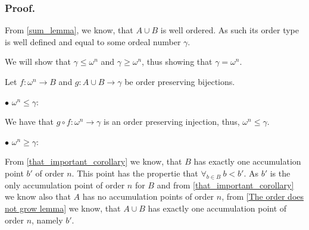 \subsubsection{Proof.}
From \ref{sum_lemma}, we know, that $A\cup B$ is well ordered. As such its order type is well 
defined and equal to some ordeal number $\gamma$. 

We will show that $\gamma \leq \omega^n$ and $\gamma \geq \omega^n$, 
thus showing that $\gamma = \omega^n$.

Let $f : \omega^n \to B$ and $g : A \cup B \to \gamma$ be order preserving bijections. 

$\bullet$ $\omega^n \leq \gamma$: 

We have that  
$g\circ f : \omega^n \to \gamma$ 
is an order preserving injection, thus, $\omega^n \leq \gamma$. 

$\bullet$ $\omega^n \geq \gamma$: 

From \ref{that_important_corollary} we know, that $B$ has exactly one accumulation point $b'$ of 
order $n$. This point has the propertie that $\forall_{b\in B}\ b<b'$.
As $b'$ is the only accumulation point of 
order $n$ for $B$ and from \ref{that_important_corollary} we know also that 
$A$ has no accumulation points of order $n$, from \ref{The order does not grow lemma} we know, 
that $A\cup B$ has exactly one accumulation point of order $n$, namely $b'$. 


